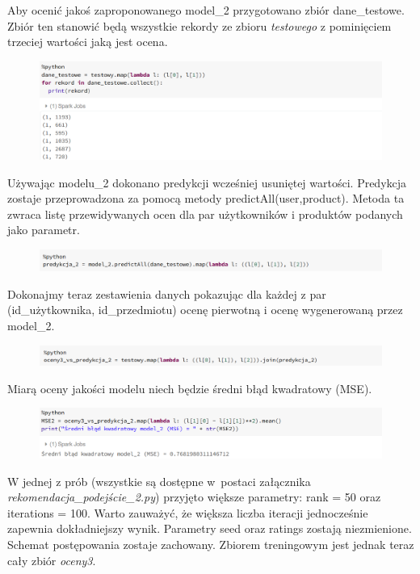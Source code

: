 \documentclass[12pt,a4paper]{report}
\begin{document}
Aby ocenić jakoś zaproponowanego model\_2 przygotowano zbiór dane\_testowe. Zbiór ten stanowić będą wszystkie rekordy ze zbioru \textit{testowego} z pominięciem trzeciej wartości jaką jest ocena.

\begin{figure}[H]
\includegraphics[scale=0.5]{obrazy/ALS9.PNG} 
\end{figure}

Używając modelu\_2 dokonano predykcji wcześniej usuniętej wartości.
Predykcja zostaje przeprowadzona za pomocą metody  predictAll(user,product). Metoda ta zwraca listę przewidywanych ocen dla par użytkowników i produktów podanych jako parametr.

\begin{figure}[H]
\includegraphics[scale=0.5]{obrazy/ALS10.PNG} 
\end{figure}

Dokonajmy teraz zestawienia danych pokazując dla każdej z par (id\_użytkownika, id\_przedmiotu) ocenę pierwotną i ocenę wygenerowaną przez model\_2.

\begin{figure}[H]
\includegraphics[scale=0.5]{obrazy/ALS11.PNG} 
\end{figure}

Miarą oceny jakości modelu niech będzie średni błąd kwadratowy (MSE).

\begin{figure}[H]
\includegraphics[scale=0.5]{obrazy/ALS12.PNG} 
\end{figure}

W jednej z prób (wszystkie są dostępne w~postaci załącznika \textit{rekomendacja\_podejście\_2.py}) przyjęto większe parametry: rank = 50 oraz iterations = 100. Warto zauważyć, że większa liczba iteracji jednocześnie zapewnia dokładniejszy wynik. Parametry seed oraz ratings zostają niezmienione. Schemat postępowania zostaje zachowany. Zbiorem treningowym jest jednak teraz cały zbiór \textit{oceny3}.
\end{document}
